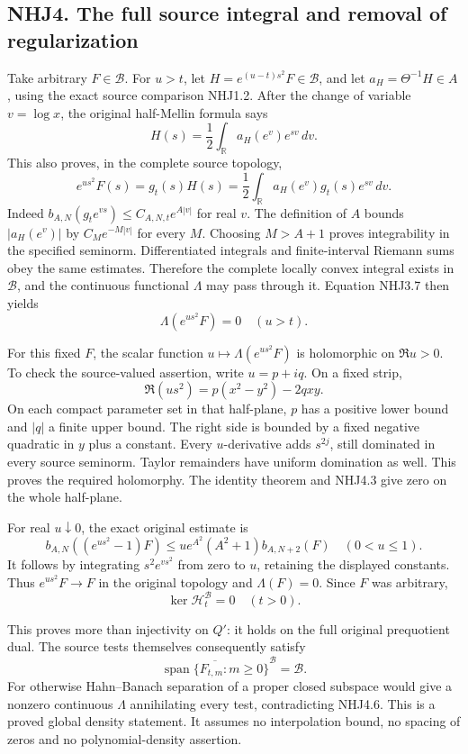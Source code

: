 \subsection{NHJ4. The full source integral and removal of
regularization}\label{nhj4.-the-full-source-integral-and-removal-of-regularization}

Take arbitrary \(F\in\mathcal B\). For \(u>t\), let
\(H=e^{(u-t)s^2}F\in\mathcal B\), and let \(a_H=\Theta^{-1}H\in A\),
using the exact source comparison NHJ1.2. After the change of variable
\(v=\log x\), the original half-Mellin formula says \[
H(s)=\frac12\int_{\mathbb R}a_H(e^v)e^{sv}\,dv.
\tag{NHJ4.1}
\] This also proves, in the complete source topology, \[
e^{us^2}F(s)=g_t(s)H(s)
=\frac12\int_{\mathbb R}a_H(e^v)g_t(s)e^{sv}\,dv.
\tag{NHJ4.2}
\] Indeed \(b_{A,N}(g_t e^{vs})\le C_{A,N,t}e^{A|v|}\) for real \(v\).
The definition of \(A\) bounds \(|a_H(e^v)|\) by \(C_Me^{-M|v|}\) for
every \(M\). Choosing \(M>A+1\) proves integrability in the specified
seminorm. Differentiated integrals and finite-interval Riemann sums obey
the same estimates. Therefore the complete locally convex integral
exists in \(\mathcal B\), and the continuous functional \(\Lambda\) may
pass through it. Equation NHJ3.7 then yields \[
\Lambda(e^{us^2}F)=0\quad(u>t).
\tag{NHJ4.3}
\]

For this fixed \(F\), the scalar function \(u\mapsto\Lambda(e^{us^2}F)\)
is holomorphic on \(\Re u>0\). To check the source-valued assertion,
write \(u=p+iq\). On a fixed strip, \[
\Re(us^2)=p(x^2-y^2)-2qxy.
\tag{NHJ4.4}
\] On each compact parameter set in that half-plane, \(p\) has a
positive lower bound and \(|q|\) a finite upper bound. The right side is
bounded by a fixed negative quadratic in \(y\) plus a constant. Every
\(u\)-derivative adds \(s^{2j}\), still dominated in every source
seminorm. Taylor remainders have uniform domination as well. This proves
the required holomorphy. The identity theorem and NHJ4.3 give zero on
the whole half-plane.

For real \(u\downarrow0\), the exact original estimate is \[
b_{A,N}((e^{us^2}-1)F)
\le u e^{A^2}(A^2+1)b_{A,N+2}(F)
\quad(0<u\le1).
\tag{NHJ4.5}
\] It follows by integrating \(s^2e^{vs^2}\) from zero to \(u\),
retaining the displayed constants. Thus \(e^{us^2}F\to F\) in the
original topology and \(\Lambda(F)=0\). Since \(F\) was arbitrary, \[
\boxed{\ker\mathcal H_t^{\mathcal B}=0\quad(t>0).}
\tag{NHJ4.6}
\]

This proves more than injectivity on \(Q'\): it holds on the full
original prequotient dual. The source tests themselves consequently
satisfy \[
\boxed{\overline{\operatorname{span}\{F_{t,m}:m\ge0\}}^{\mathcal B}
=\mathcal B.}
\tag{NHJ4.7}
\] For otherwise Hahn--Banach separation of a proper closed subspace
would give a nonzero continuous \(\Lambda\) annihilating every test,
contradicting NHJ4.6. This is a proved global density statement. It
assumes no interpolation bound, no spacing of zeros and no
polynomial-density assertion.

